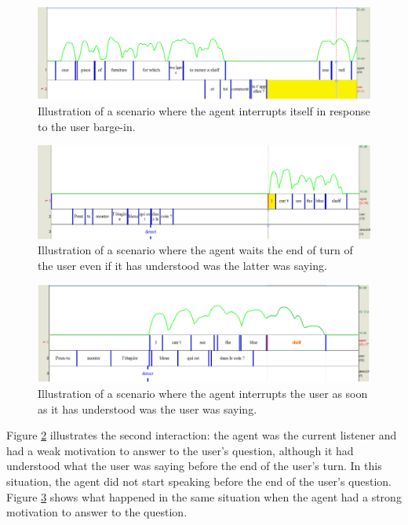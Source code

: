 \begin{figure}
\centering
\includegraphics[width=\linewidth]{figure/volume_transcript_1_2.png}
\caption{Illustration of a scenario where the agent interrupts itself in response to the user barge-in.}
\label{sc_2}
\end{figure}

\begin{figure}
\centering
\includegraphics[width=\linewidth]{figure/volume_transcript_2_2.png}
\caption{Illustration of a scenario where the agent waits the end of turn of the user even if it has understood was the latter was saying.}
\label{sc_3}
\end{figure}

\begin{figure}
\centering
\includegraphics[width=\linewidth]{figure/volume_transcript_2_1.png}
\caption{Illustration of a scenario where the agent interrupts the user as soon as it has understood was the user was saying.}
\label{sc_4}
\end{figure}

Figure \ref{sc_3} illustrates the second interaction: the agent was the current listener and had a weak motivation to answer to the user's question, although it had understood what the user was saying before the end of the user's turn. In this situation, the agent did not start speaking before the end of the user's question. Figure \ref{sc_4} shows what happened in the same situation when the agent had a strong motivation to answer to the question. 

